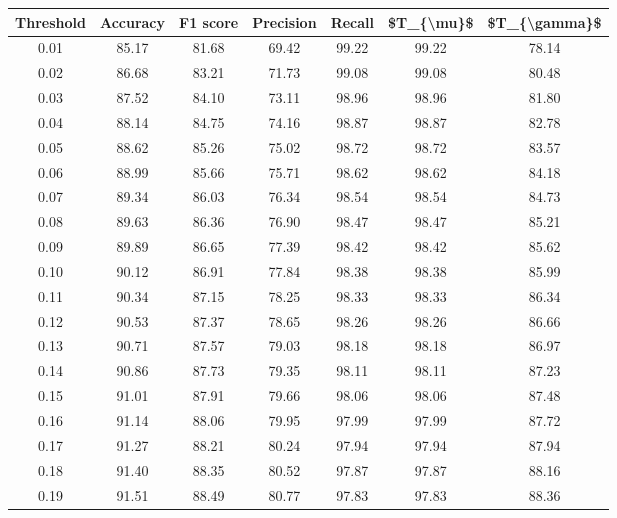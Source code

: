 \begin{tabular}{|c|c|c|c|c|c|c|}
\hline
 Threshold &  Accuracy &  F1 score &  Precision &  Recall &  \$T\_\{\textbackslash mu\}\$ &  \$T\_\{\textbackslash gamma\}\$ \\
\hline
      0.01 &     85.17 &     81.68 &      69.42 &   99.22 &      99.22 &         78.14 \\
      0.02 &     86.68 &     83.21 &      71.73 &   99.08 &      99.08 &         80.48 \\
      0.03 &     87.52 &     84.10 &      73.11 &   98.96 &      98.96 &         81.80 \\
      0.04 &     88.14 &     84.75 &      74.16 &   98.87 &      98.87 &         82.78 \\
      0.05 &     88.62 &     85.26 &      75.02 &   98.72 &      98.72 &         83.57 \\
      0.06 &     88.99 &     85.66 &      75.71 &   98.62 &      98.62 &         84.18 \\
      0.07 &     89.34 &     86.03 &      76.34 &   98.54 &      98.54 &         84.73 \\
      0.08 &     89.63 &     86.36 &      76.90 &   98.47 &      98.47 &         85.21 \\
      0.09 &     89.89 &     86.65 &      77.39 &   98.42 &      98.42 &         85.62 \\
      0.10 &     90.12 &     86.91 &      77.84 &   98.38 &      98.38 &         85.99 \\
      0.11 &     90.34 &     87.15 &      78.25 &   98.33 &      98.33 &         86.34 \\
      0.12 &     90.53 &     87.37 &      78.65 &   98.26 &      98.26 &         86.66 \\
      0.13 &     90.71 &     87.57 &      79.03 &   98.18 &      98.18 &         86.97 \\
      0.14 &     90.86 &     87.73 &      79.35 &   98.11 &      98.11 &         87.23 \\
      0.15 &     91.01 &     87.91 &      79.66 &   98.06 &      98.06 &         87.48 \\
      0.16 &     91.14 &     88.06 &      79.95 &   97.99 &      97.99 &         87.72 \\
      0.17 &     91.27 &     88.21 &      80.24 &   97.94 &      97.94 &         87.94 \\
      0.18 &     91.40 &     88.35 &      80.52 &   97.87 &      97.87 &         88.16 \\
      0.19 &     91.51 &     88.49 &      80.77 &   97.83 &      97.83 &         88.36 \\

\end{tabular}
